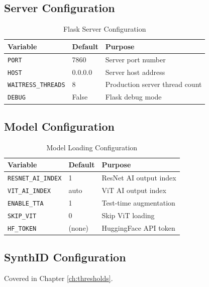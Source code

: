 \documentclass[12pt,a4paper]{book}
\begin{document}
\begin{itemize}
\subsection{Server Configuration}

\begin{table}[H]
\centering
\captionsetup{justification=centering}
\caption{Flask Server Configuration}
\begin{tabular}{|l|l|p{4cm}|}
\hline
\textbf{Variable} & \textbf{Default} & \textbf{Purpose} \\
\hline
\texttt{PORT} & 7860 & Server port number \\
\hline
\texttt{HOST} & 0.0.0.0 & Server host address \\
\hline
\texttt{WAITRESS\_THREADS} & 8 & Production server thread count \\
\hline
\texttt{DEBUG} & False & Flask debug mode \\
\hline
\end{tabular}
\end{table}

\subsection{Model Configuration}

\begin{table}[H]
\centering
\captionsetup{justification=centering}
\caption{Model Loading Configuration}
\begin{tabular}{|l|l|p{4cm}|}
\hline
\textbf{Variable} & \textbf{Default} & \textbf{Purpose} \\
\hline
\texttt{RESNET\_AI\_INDEX} & 1 & ResNet AI output index \\
\hline
\texttt{VIT\_AI\_INDEX} & auto & ViT AI output index \\
\hline
\texttt{ENABLE\_TTA} & 1 & Test-time augmentation \\
\hline
\texttt{SKIP\_VIT} & 0 & Skip ViT loading \\
\hline
\texttt{HF\_TOKEN} & (none) & HuggingFace API token \\
\hline
\end{tabular}
\end{table}

\subsection{SynthID Configuration}

Covered in Chapter \ref{ch:thresholds}.


\end{itemize}
\end{document}
